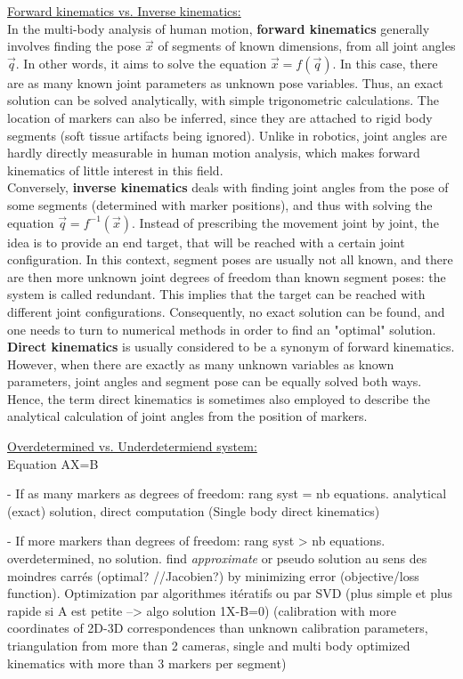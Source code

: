 \noindent\underline{Forward kinematics vs. Inverse kinematics:}\\
In the multi-body analysis of human motion, \textbf{forward kinematics} generally involves finding the pose $\overrightarrow{x}$ of segments of known dimensions, from all joint angles $\overrightarrow{q}$. In other words, it aims to solve the equation $\overrightarrow{x}=f(\overrightarrow{q})$. In this case, there are as many known joint parameters as unknown pose variables. Thus, an exact solution can be solved analytically, with simple trigonometric calculations. The location of markers can also be inferred, since they are attached to rigid body segments (soft tissue artifacts being ignored). Unlike in robotics, joint angles are hardly directly measurable in human motion analysis, which makes forward kinematics of little interest in this field.\\
Conversely, \textbf{inverse kinematics} deals with finding joint angles from the pose of some segments (determined with marker positions), and thus with solving the equation $\overrightarrow{q}=f^{-1}(\overrightarrow{x})$. Instead of prescribing the movement joint by joint, the idea is to provide an end target, that will be reached with a certain joint configuration. In this context, segment poses are usually not all known, and there are then more unknown joint degrees of freedom than known segment poses: the system is called redundant. This implies that the target can be reached with different joint configurations. Consequently, no exact solution can be found, and one needs to turn to numerical methods in order to find an "optimal" solution.\\
\textbf{Direct kinematics} is usually considered to be a synonym of forward kinematics. However, when there are exactly as many unknown variables as known parameters, joint angles and segment pose can be equally solved both ways. Hence, the term direct kinematics is sometimes also employed to describe the analytical calculation of joint angles from the position of markers.


\vspace*{0.5cm}

\noindent\underline{Overdetermined vs. Underdetermiend system:}\\
Equation AX=B

- If as many markers as degrees of freedom: rang syst = nb equations. analytical (exact) solution, direct computation (Single body direct kinematics)

- If more markers than degrees of freedom: rang syst > nb equations. overdetermined, no solution. find \emph{approximate} or pseudo solution au sens des moindres carrés (optimal? //Jacobien?) by minimizing error (objective/loss function). Optimization par algorithmes itératifs ou par SVD (plus simple et plus rapide si A est petite --> algo solution 1X-B=0)
(calibration with more coordinates of 2D-3D correspondences than unknown calibration parameters, triangulation from more than 2 cameras, single and multi body optimized kinematics with more than 3 markers per segment)

